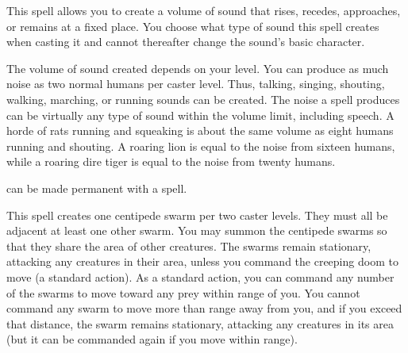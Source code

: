 \spellrng{\rngclose}
\begin{spelleffect}
  This spell allows you to create a volume of sound that rises, recedes, approaches, or remains at a fixed place. You choose what type of sound this spell creates when casting it and cannot thereafter change the sound's basic character.
  \par The volume of sound created depends on your level. You can produce as much noise as two normal humans per caster level. Thus, talking, singing, shouting, walking, marching, or running sounds can be created. The noise a  spell produces can be virtually any type of sound within the volume limit, including speech. A horde of rats running and squeaking is about the same volume as eight humans running and shouting. A roaring lion is equal to the noise from sixteen humans, while a roaring dire tiger is equal to the noise from twenty humans.
\end{spelleffect}
\begin{spellnotes}
   can be made permanent with a  spell.
\end{spellnotes}

\spelldur{\durmed}
\begin{spelleffect}
  This spell creates one centipede swarm per two caster levels. They must all be adjacent at least one other swarm. You may summon the centipede swarms so that they share the area of other creatures. The swarms remain stationary, attacking any creatures in their area, unless you command the creeping doom to move (a standard action). As a standard action, you can command any number of the swarms to move toward any prey within \rngmed range of you. You cannot command any swarm to move more than \rngmed range away from you, and if you exceed that distance, the swarm remains stationary, attacking any creatures in its area (but it can be commanded again if you move within range).
\end{spelleffect}

